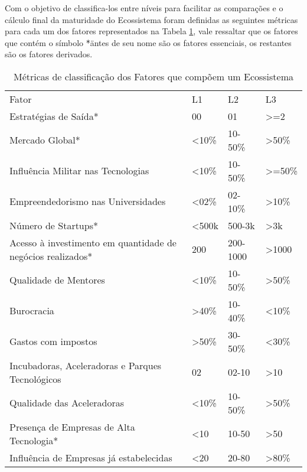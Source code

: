 Com o objetivo de classifica-los entre níveis para facilitar as comparações e o cálculo final da maturidade do Ecossistema foram definidas as seguintes métricas para cada um dos fatores representados na Tabela \ref{tabela:metricas_de_classificacao_dos_fatores}, vale ressaltar que os fatores que contém o símbolo \"*\" antes de seu nome são os fatores essenciais, os restantes são os fatores derivados.

\begin{table}[!htb]
\centering
\caption{Métricas de classificação dos Fatores que compõem um Ecossistema}
\label{tabela:metricas_de_classificacao_dos_fatores}
\begin{tabular}{llll}
Fator                                                      &     L1     &     L2     &     L3   \\
Estratégias de Saída*                                      &     00     &     01     &    >=2   \\
Mercado Global*                                            &    <10\%   &   10-50\%  &    >50\% \\
Influência Militar nas Tecnologias                         &    <10\%   &   10-50\%  &   >=50\% \\
Empreendedorismo nas Universidades                         &    <02\%   &   02-10\%  &    >10\% \\
Número de Startups*                                        &   <500k    &   500-3k   &    >3k   \\
Acesso à investimento em quantidade de negócios realizados*&   200     &   200-1000 &    >1000 \\
Qualidade de Mentores                                      &    <10\%   &   10-50\%  &    >50\% \\
Burocracia                                                 &    >40\%   &   10-40\%  &    <10\% \\
Gastos com impostos                                        &    >50\%   &   30-50\%  &    <30\% \\
Incubadoras, Aceleradoras e Parques Tecnológicos           &     02     &    02-10   &    >10   \\
Qualidade das Aceleradoras                                 &    <10\%   &   10-50\%  &    >50\% \\
Presença de Empresas de Alta Tecnologia*                   &    <10     &   10-50    &    >50   \\
Influência de Empresas já estabelecidas                    &    <20     &   20-80    &    >80\% \\

\end{tabular}
\end{table}
